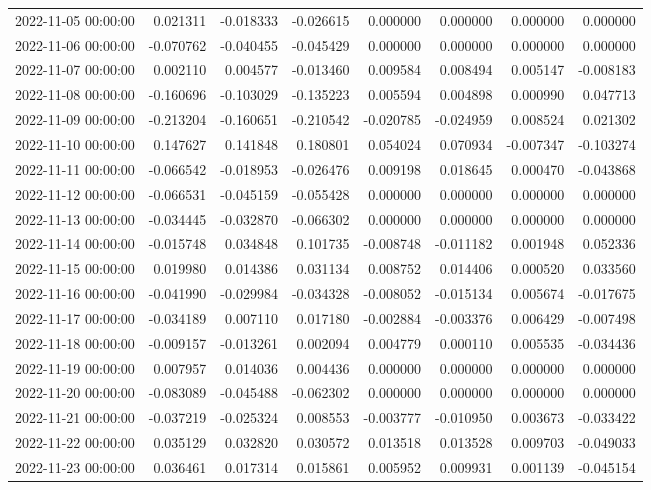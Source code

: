 \begin{tabular}{lrrrrrrr}
2022-11-05 00:00:00 & 0.021311 & -0.018333 & -0.026615 & 0.000000 & 0.000000 & 0.000000 & 0.000000 \\
2022-11-06 00:00:00 & -0.070762 & -0.040455 & -0.045429 & 0.000000 & 0.000000 & 0.000000 & 0.000000 \\
2022-11-07 00:00:00 & 0.002110 & 0.004577 & -0.013460 & 0.009584 & 0.008494 & 0.005147 & -0.008183 \\
2022-11-08 00:00:00 & -0.160696 & -0.103029 & -0.135223 & 0.005594 & 0.004898 & 0.000990 & 0.047713 \\
2022-11-09 00:00:00 & -0.213204 & -0.160651 & -0.210542 & -0.020785 & -0.024959 & 0.008524 & 0.021302 \\
2022-11-10 00:00:00 & 0.147627 & 0.141848 & 0.180801 & 0.054024 & 0.070934 & -0.007347 & -0.103274 \\
2022-11-11 00:00:00 & -0.066542 & -0.018953 & -0.026476 & 0.009198 & 0.018645 & 0.000470 & -0.043868 \\
2022-11-12 00:00:00 & -0.066531 & -0.045159 & -0.055428 & 0.000000 & 0.000000 & 0.000000 & 0.000000 \\
2022-11-13 00:00:00 & -0.034445 & -0.032870 & -0.066302 & 0.000000 & 0.000000 & 0.000000 & 0.000000 \\
2022-11-14 00:00:00 & -0.015748 & 0.034848 & 0.101735 & -0.008748 & -0.011182 & 0.001948 & 0.052336 \\
2022-11-15 00:00:00 & 0.019980 & 0.014386 & 0.031134 & 0.008752 & 0.014406 & 0.000520 & 0.033560 \\
2022-11-16 00:00:00 & -0.041990 & -0.029984 & -0.034328 & -0.008052 & -0.015134 & 0.005674 & -0.017675 \\
2022-11-17 00:00:00 & -0.034189 & 0.007110 & 0.017180 & -0.002884 & -0.003376 & 0.006429 & -0.007498 \\
2022-11-18 00:00:00 & -0.009157 & -0.013261 & 0.002094 & 0.004779 & 0.000110 & 0.005535 & -0.034436 \\
2022-11-19 00:00:00 & 0.007957 & 0.014036 & 0.004436 & 0.000000 & 0.000000 & 0.000000 & 0.000000 \\
2022-11-20 00:00:00 & -0.083089 & -0.045488 & -0.062302 & 0.000000 & 0.000000 & 0.000000 & 0.000000 \\
2022-11-21 00:00:00 & -0.037219 & -0.025324 & 0.008553 & -0.003777 & -0.010950 & 0.003673 & -0.033422 \\
2022-11-22 00:00:00 & 0.035129 & 0.032820 & 0.030572 & 0.013518 & 0.013528 & 0.009703 & -0.049033 \\
2022-11-23 00:00:00 & 0.036461 & 0.017314 & 0.015861 & 0.005952 & 0.009931 & 0.001139 & -0.045154 \\

\end{tabular}
